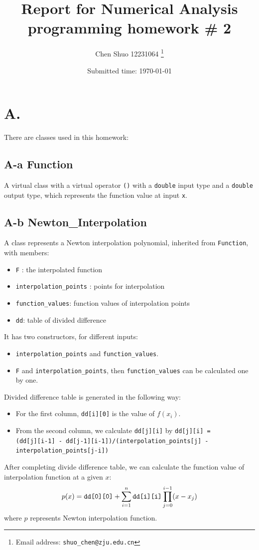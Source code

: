 \documentclass[a4paper]{article}
\begin{document}
\title{Report for Numerical Analysis programming homework \# 2}

\author{Chen Shuo 12231064
  \thanks{Email address: \texttt{shuo\_chen@zju.edu.cn}}}


\date{Submitted time: \today}

\maketitle
\section*{A.}
There are classes used in this homework:

\subsection*{A-a Function}
A virtual class with a virtual operator \verb|()| with a \verb|double| input type and a \verb|double| output type, which represents the function value at input \verb|x|.
\subsection*{A-b Newton\_Interpolation}
A class represents a Newton interpolation polynomial, inherited from \verb|Function|, with members:
\begin{itemize}
  \item \verb|F| : the interpolated function
  \item \verb|interpolation_points| : points for interpolation
  \item \verb|function_values|: function values of interpolation points
  \item \verb|dd|: table of divided difference
\end{itemize}
It has two constructors, for different inputs:
\begin{itemize}
  \item \verb|interpolation_points| and \verb|function_values|.
  \item \verb|F| and \verb|interpolation_points|, then \verb|function_values| can be calculated one by one.               
\end{itemize}
Divided difference table is generated in the following way:
\begin{itemize}
  \item For the first column, \verb|dd[i][0]| is the value of $f(x_i)$.
  \item From the second column, we calculate \verb|dd[j][i]| by \verb|dd[j][i] = | \\
    \verb|(dd[j][i-1] - dd[j-1][i-1])/(interpolation_points[j] - interpolation_points[j-i])|
\end{itemize}
After completing divide difference table, we can calculate the function value of interpolation function at a given $x$:
$$
p(x) = \verb|dd[0][0]| + \sum \limits_{i=1}^n\verb|dd[i][i]|\prod \limits_{j = 0}^{i-1}(x-x_j)
$$
where $p$ represents Newton interpolation function.
\end{document}

